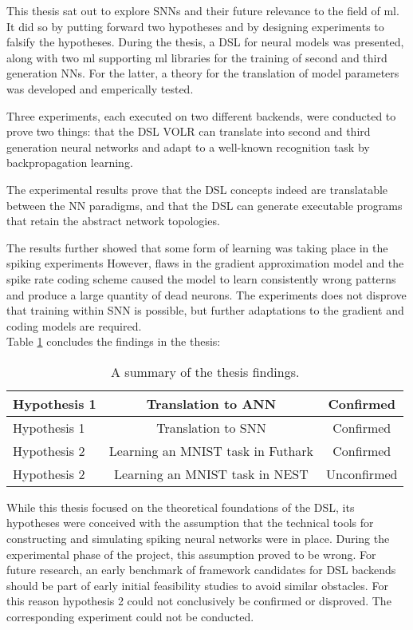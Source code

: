 \documentclass[report.tex]{subfiles}
\begin{document}

This thesis sat out to explore \glspl{SNN} and their future relevance to the field of
\gls{ml}.
It did so by putting forward two hypotheses and by designing experiments to
falsify the hypotheses.
During the thesis, a \gls{DSL} for neural models was presented, along with two \gls{ml}
supporting \gls{ml} libraries for the training of second and third generation
\glspl{NN}. 
For the latter, a theory for the translation of model parameters was developed
and emperically tested.

Three experiments, each executed on two different backends, were conducted to
prove two things: that the \gls{DSL} VOLR can translate into second and third
generation neural networks and adapt to a well-known recognition task by
backpropagation learning.

The experimental results prove that the \gls{DSL} concepts indeed are
translatable between the \gls{NN} paradigms, and that the \gls{DSL} can generate
executable programs that retain the abstract network topologies.

The results further showed that some form of learning was taking place in the
spiking experiments
However, flaws in the gradient approximation model and the spike rate coding scheme
caused the model to learn consistently wrong patterns and produce a large
quantity of dead neurons.
The experiments does not disprove that training within \gls{SNN} is possible,
but further adaptations to the gradient and coding models are required.
\\[0.1cm]

Table \ref{tab:findings} concludes the findings in the thesis:

\def\arraystretch{1.5}
\begin{table}
  \centering
  \begin{tabular}{l c c}
     Hypothesis 1 & Translation to \gls{ANN} & Confirmed \\ \hline
     Hypothesis 1 & Translation to \gls{SNN} & Confirmed \\ \hline
     Hypothesis 2 & Learning an MNIST task in Futhark & Confirmed \\ \hline
     Hypothesis 2 & Learning an MNIST task in NEST & Unconfirmed \\ \hline
  \end{tabular}
  \caption{A summary of the thesis findings.}
  \label{tab:findings}
\end{table}

While this thesis focused on the theoretical foundations of the DSL, its hypotheses were conceived with the assumption that the
technical tools for constructing and simulating spiking neural networks were in place.
During the experimental phase of the project, this assumption proved to be wrong.
For future research, an early benchmark of framework candidates for DSL backends should be part of early initial feasibility studies to avoid similar obstacles. For this reason hypothesis 2 could not conclusively be confirmed or disproved. The corresponding experiment could not be conducted.
\end{document}
